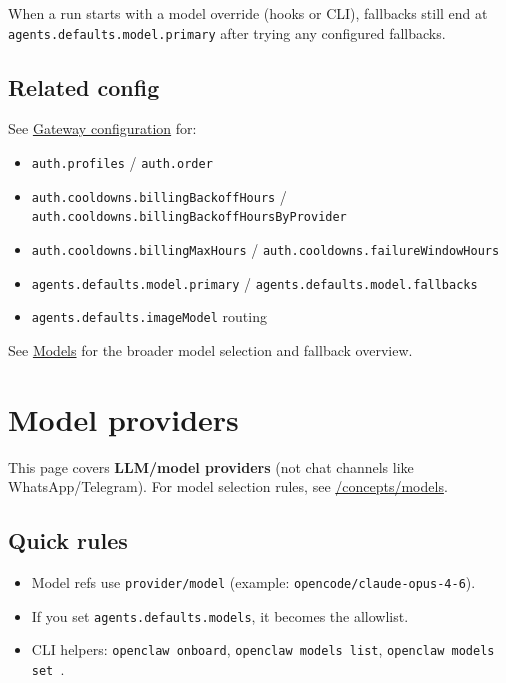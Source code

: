 When a run starts with a model override (hooks or CLI), fallbacks still end at
\texttt{agents.defaults.model.primary} after trying any configured fallbacks.

\subsection{Related config}


See \href{/gateway/configuration}{Gateway configuration} for:

\begin{itemize}
  \item \texttt{auth.profiles} / \texttt{auth.order}
  \item \texttt{auth.cooldowns.billingBackoffHours} / \texttt{auth.cooldowns.billingBackoffHoursByProvider}
  \item \texttt{auth.cooldowns.billingMaxHours} / \texttt{auth.cooldowns.failureWindowHours}
  \item \texttt{agents.defaults.model.primary} / \texttt{agents.defaults.model.fallbacks}
  \item \texttt{agents.defaults.imageModel} routing
\end{itemize}


See \href{/concepts/models}{Models} for the broader model selection and fallback overview.


\clearpage

\section{Model providers}


This page covers \textbf{LLM/model providers} (not chat channels like WhatsApp/Telegram).
For model selection rules, see \href{/concepts/models}{/concepts/models}.

\subsection{Quick rules}


\begin{itemize}
  \item Model refs use \texttt{provider/model} (example: \texttt{opencode/claude-opus-4-6}).
  \item If you set \texttt{agents.defaults.models}, it becomes the allowlist.
  \item CLI helpers: \texttt{openclaw onboard}, \texttt{openclaw models list}, \texttt{openclaw models set }.
\end{itemize}


